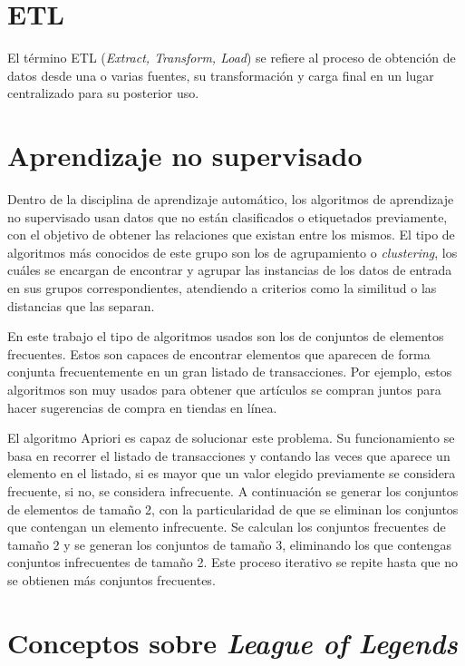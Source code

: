 
\section{ETL}
El término ETL (\textit{Extract, Transform, Load}) se refiere al proceso de obtención de datos desde una o varias fuentes, su transformación y carga final en un lugar centralizado para su posterior uso.

\section{Aprendizaje no supervisado}
Dentro de la disciplina de aprendizaje automático, los algoritmos de aprendizaje no supervisado usan datos que no están clasificados o etiquetados previamente, con el objetivo de obtener las relaciones que existan entre los mismos. El tipo de algoritmos más conocidos de este grupo son los de agrupamiento o \textit{clustering}, los cuáles se encargan de encontrar y agrupar las instancias de los datos de entrada en sus grupos correspondientes, atendiendo a criterios como la similitud o las distancias que las separan.

En este trabajo el tipo de algoritmos usados son los de conjuntos de elementos frecuentes. Estos son capaces de encontrar elementos que aparecen de forma conjunta frecuentemente en un gran listado de transacciones. Por ejemplo, estos algoritmos son muy usados para obtener que artículos se compran juntos para hacer sugerencias de compra en tiendas en línea.

El algoritmo Apriori es capaz de solucionar este problema. Su funcionamiento se basa en recorrer el listado de transacciones y contando las veces que aparece un elemento en el listado, si es mayor que un valor elegido previamente se considera frecuente, si no, se considera infrecuente. A continuación se generar los conjuntos de elementos de tamaño 2, con la particularidad de que se eliminan los conjuntos que contengan un elemento infrecuente. Se calculan los conjuntos frecuentes de tamaño 2 y se generan los conjuntos de tamaño 3, eliminando los que contengas conjuntos infrecuentes de tamaño 2. Este proceso iterativo se repite hasta que no se obtienen más conjuntos frecuentes.

\section{Conceptos sobre \textit{League of Legends}}
\label{sec:lol-conceptos}
